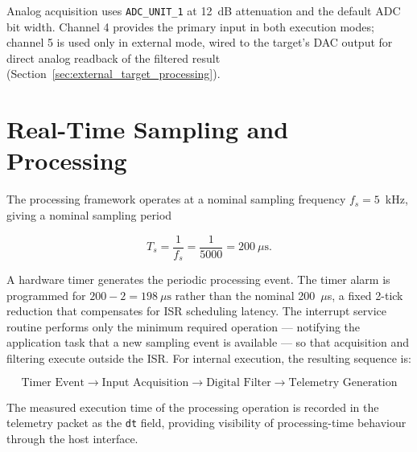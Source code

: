 Analog acquisition uses \texttt{ADC\_UNIT\_1} at 12~dB attenuation and the
default ADC bit width. Channel 4 provides the primary input in both execution
modes; channel 5 is used only in external mode, wired to the target's DAC
output for direct analog readback of the filtered result
(Section~\ref{sec:external_target_processing}).


\section{Real-Time Sampling and Processing}
\label{sec:realtime_processing}

The processing framework operates at a nominal sampling frequency $f_s =
    5$~kHz, giving a nominal sampling period

\begin{equation}
    T_s = \frac{1}{f_s} = \frac{1}{5000} = 200~\mu\mathrm{s}.
    \label{eq:sampling_period}
\end{equation}

A hardware timer generates the periodic processing event. The timer alarm is
programmed for $200 - 2 = 198~\mu\mathrm{s}$ rather than the nominal
200~$\mu$s, a fixed 2-tick reduction that compensates for ISR scheduling
latency. The interrupt service routine performs only the minimum required
operation — notifying the application task that a new sampling event is
available — so that acquisition and filtering execute outside the ISR. For
internal execution, the resulting sequence is:

\begin{equation}
    \boxed{
        \text{Timer Event}
        \rightarrow
        \text{Input Acquisition}
        \rightarrow
        \text{Digital Filter}
        \rightarrow
        \text{Telemetry Generation}
    }
    \label{eq:internal_sequence}
\end{equation}

The measured execution time of the processing operation is recorded in the
telemetry packet as the \texttt{dt} field, providing visibility of
processing-time behaviour through the host interface.



